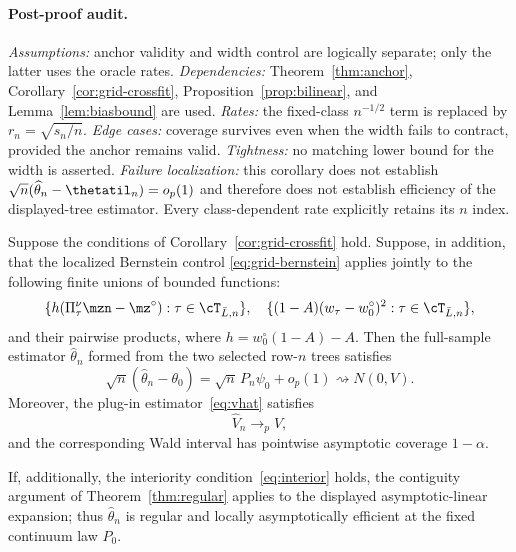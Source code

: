 \paragraph{Post-proof audit.}
\emph{Assumptions:} anchor validity and width control are logically separate;
only the latter uses the oracle rates.
\emph{Dependencies:} Theorem~\ref{thm:anchor},
Corollary~\ref{cor:grid-crossfit},
Proposition~\ref{prop:bilinear}, and Lemma~\ref{lem:biasbound} are used.
\emph{Rates:} the fixed-class $n^{-1/2}$ term is replaced by
$r_n=\sqrt{s_n/n}$.
\emph{Edge cases:} coverage survives even when the width fails to contract,
provided the anchor remains valid.
\emph{Tightness:} no matching lower bound for the width is asserted.
\emph{Failure localization:} this corollary does not establish
$\sqrt n(\widehat\theta_n-\thetatil_n)=o_p(1)$ and therefore does not establish
efficiency of the displayed-tree estimator.
Every class-dependent rate explicitly retains its $n$ index.

\begin{theorem}
\label{thm:grid-fullsample}
Suppose the conditions of Corollary~\ref{cor:grid-crossfit} hold.  Suppose,
in addition, that the localized Bernstein control
\eqref{eq:grid-bernstein} applies jointly to the following finite unions of
bounded functions:
\[
 \{h(\Pi^\nu_\tau\mzn-\mz^\circ):\tau\in\cT_{\bar L,n}\},
 \quad
 \{(1-A)(w_\tau-w_0^\circ)^2:\tau\in\cT_{\bar L,n}\},
\]
and their pairwise products, where
$h=w_0^\circ(1-A)-A$.  Then the full-sample estimator
$\widehat\theta_n$ formed from the two selected row-$n$ trees satisfies
\[
 \sqrt n(\widehat\theta_n-\theta_0)
 =\sqrt n\,P_n\psi_0+o_p(1)
 \rightsquigarrow N(0,V).
\]
Moreover, the plug-in estimator~\eqref{eq:vhat} satisfies
\[
 \widehat V_n\to_pV,
\]
and the corresponding Wald interval has pointwise asymptotic coverage
$1-\alpha$.

If, additionally, the interiority condition~\eqref{eq:interior} holds, the
contiguity argument of Theorem~\ref{thm:regular} applies to the displayed
asymptotic-linear expansion; thus $\widehat\theta_n$ is regular and locally
asymptotically efficient at the fixed continuum law $P_0$.
\end{theorem}

